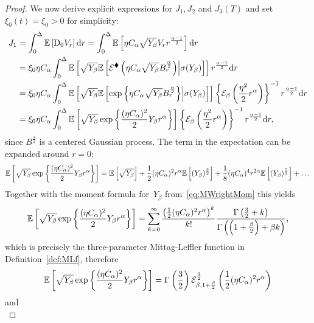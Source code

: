 \begin{proof}
We now derive explicit expressions for $J_1, J_2$ and $J_3(T)$ and set $\xi_0(t)=\xi_0>0$ for simplicity:
\begin{align}
    J_1 &=\int_0^{\Delta} \mathbb{E}\left[\mathrm{D}_0 V_r\right] \mathrm{d} r = \int_0^{\Delta} \mathbb{E}\left[\eta C_{\alpha} \sqrt{Y_\beta} V_r r^{\frac{\alpha-1}2}\right] \mathrm{d} r \\
    &= \xi_0 \eta C_{\alpha} \int_0^{\Delta} \mathbb{E}\left[ \sqrt{Y_\beta}\mathbb{E}\left[ \mathcal{E}^\blacklozenge\left(\eta C_{\alpha} \sqrt{Y_\beta} B^{\frac{\alpha}2}_r\right) \middle \vert  \sigma(Y_\beta)\right]\right] r^{\frac{\alpha-1}2} \mathrm{d} r \\
    &= \xi_0 \eta C_{\alpha} \int_0^{\Delta} \mathbb{E}\left[ \sqrt{Y_\beta}\mathbb{E}\left[ \exp\left\{\eta C_{\alpha}\sqrt{Y_\beta} B^{\frac\alpha2}_r\right\} \middle \vert  \sigma(Y_\beta)\right]\right] \left\{\mathcal{E}_{\beta}\left(\frac{\eta^2}2 r^\alpha\right)\right\}^{-1} r^{\frac{\alpha-1}2} \mathrm{d} r \\
    &= \xi_0 \eta C_{\alpha} \int_0^{\Delta} \mathbb{E}\left[ \sqrt{Y_\beta}\exp\left\{ \frac{(\eta C_{\alpha})^2}2 Y_\beta r^{\alpha}\right\} \right] \left\{\mathcal{E}_{\beta}\left(\frac{\eta^2}2 r^\alpha\right)\right\}^{-1} r^{\frac{\alpha-1}2} \mathrm{d} r ,
\end{align}
since $B^{\frac\alpha2}$ is a centered Gaussian process. 
The term in the expectation can be expanded around $r=0$:
\[
\mathbb{E}\left[ \sqrt{Y_\beta}\exp\left\{ \frac{(\eta C_{\alpha})^2}2 Y_\beta r^{\alpha}\right\} \right] = \mathbb{E}\left[\sqrt{Y_\beta}\right] + \frac{1}{2}(\eta C_{\alpha})^2 r^\alpha \mathbb{E}\left[(Y_\beta)^{\frac32}\right] + \frac{1}{8}(\eta C_{\alpha})^4 r^{2\alpha} \mathbb{E}\left[(Y_\beta)^{\frac52}\right] + \dots
\]
Together with the moment formula for~$Y_\beta$ from~\eqref{eq:MWrightMom} this yields
\[
\mathbb{E}\left[ \sqrt{Y_\beta}\exp\left\{ \frac{(\eta C_{\alpha})^2}2 Y_\beta r^{\alpha}\right\} \right] = \sum^\infty_{k=0} \frac{\left(\frac12 (\eta C_{\alpha})^2 r^\alpha\right)^k}{k!} \frac{\Gamma\left(\frac32 + k\right)}{\Gamma\left(\left(1+\frac\beta2\right)+\beta k\right)},
\]
which is precisely the three-parameter Mittag-Leffler function in Definition~\ref{def:MLf}, therefore
\[
\mathbb{E}\left[ \sqrt{Y_\beta}\exp\left\{ \frac{(\eta C_{\alpha})^2}2 Y_\beta r^{\alpha}\right\} \right] = \Gamma\left(\frac32\right) \mathcal{E}_{\beta, 1 + \frac\beta2}^{\frac32} \left(\frac12 (\eta C_{\alpha})^2 r^\alpha\right)
\]
and
\begin{equation}

\end{equation}
\end{proof}
